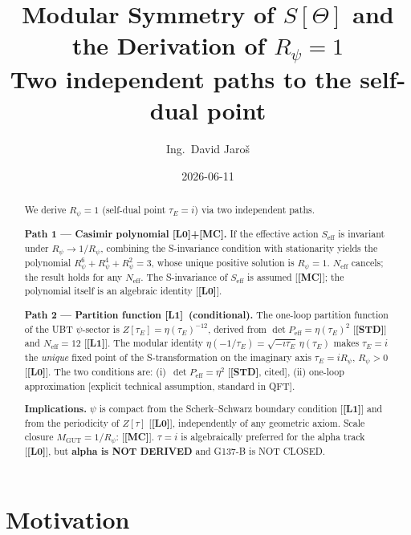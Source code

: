 \documentclass[12pt,a4paper]{article}
\title{\textbf{Modular Symmetry of $S[\Theta]$ and the Derivation of $R_\psi = 1$}\\[4pt]
\large Two independent paths to the self-dual point}
\author{Ing.\ David Jaroš}
\date{2026-06-11}
\theoremstyle{definition}\newtheorem{definition}[theorem]{Definition}
\theoremstyle{remark}\newtheorem{remark}[theorem]{Remark}
\newcommand{\Lz}{\textbf{[L0]}}
\newcommand{\Lo}{\textbf{[L1]}}
\newcommand{\MC}{\textbf{[MC]}}
\newcommand{\STD}{\textbf{[STD]}}
\begin{document}
\maketitle

\begin{abstract}
We derive $R_\psi = 1$ (self-dual point $\tau_E = i$) via two
independent paths.

\textbf{Path 1 — Casimir polynomial \Lz+\MC.}
If the effective action $S_{\mathrm{eff}}$ is invariant under
$R_\psi\to 1/R_\psi$, combining the S-invariance condition with
stationarity yields the polynomial $R_\psi^6+R_\psi^4+R_\psi^2=3$,
whose unique positive solution is $R_\psi=1$.
$N_{\mathrm{eff}}$ cancels; the result holds for any $N_{\mathrm{eff}}$.
The S-invariance of $S_{\mathrm{eff}}$ is assumed [\MC]; the
polynomial itself is an algebraic identity [\Lz].

\textbf{Path 2 — Partition function \Lo\ (conditional).}
The one-loop partition function of the UBT $\psi$-sector is
$Z[\tau_E]=\eta(\tau_E)^{-12}$, derived from
$\det P_{\mathrm{eff}}=\eta(\tau_E)^2$ [\STD] and $N_{\mathrm{eff}}=12$
[\Lo].  The modular identity
$\eta(-1/\tau_E)=\sqrt{-i\tau_E}\,\eta(\tau_E)$ makes $\tau_E=i$
the \emph{unique} fixed point of the S-transformation on the
imaginary axis $\tau_E=iR_\psi$, $R_\psi>0$ [\Lz].
The two conditions are: (i)~$\det P_{\mathrm{eff}}=\eta^2$
[\STD, cited], (ii) one-loop approximation [explicit technical
assumption, standard in QFT].

\textbf{Implications.}  $\psi$ is compact from the Scherk--Schwarz
boundary condition [\Lo] and from the periodicity of $Z[\tau]$
[\Lz], independently of any geometric axiom.  Scale closure
$M_{\mathrm{GUT}}=1/R_\psi$: [\MC].
$\tau=i$ is algebraically preferred for the alpha track [\Lz],
but \textbf{alpha is NOT DERIVED} and G137-B is NOT CLOSED.
\end{abstract}

\tableofcontents

\section{Motivation}
\label{sec:motivation}
\end{document}
